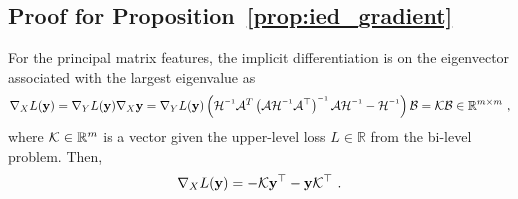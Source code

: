 \subsection{Proof for Proposition~\ref{prop:ied_gradient}}
For the principal matrix features, the implicit differentiation is on the eigenvector associated with the largest eigenvalue as
%
\begin{equation}
\nabla_X L(\mathbf{y})
= \nabla_Y L(\mathbf{y}) \nabla_X \mathbf{y}
= \nabla_Y L(\mathbf{y}) 
\left( \mc{H}\inv \mc{A}^{T} \left( \mc{A} \mc{H}\inv \mc{A}^\top \right)\inv \mc{A} \mc{H}\inv - \mc{H}\inv \right) \mc{B}
= \mc{K} \mc{B} \in \mathbb{R}^{m \times m}\ ,
\end{equation}
%
where $\mathcal{K} \in \mathbb{R}^{m}$ is a vector given the upper-level loss $L \in \mathbb{R}$ from the bi-level problem.
Then,
%
\begin{equation}
\label{eq:prop_34_app}
\nabla_X L(\mathbf{y}) = -\mathcal{K} \mathbf{y}^\top - \mathbf{y} \mathcal{K}^\top\ .
\end{equation}

